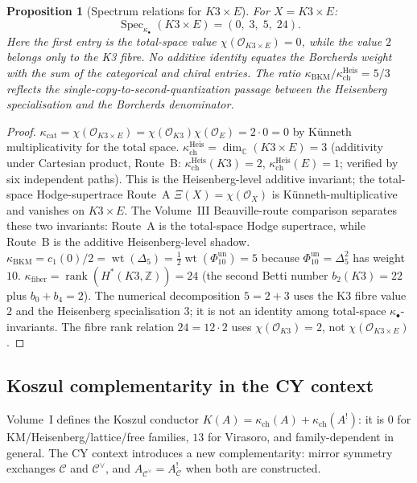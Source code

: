 \documentclass[11pt]{article}
\theoremstyle{plain}
\newtheorem{proposition}[theorem]{Proposition}
\theoremstyle{definition}
\theoremstyle{remark}
\newcommand{\cC}{\mathcal{C}}
\newcommand{\cO}{\mathcal{O}}
\newcommand{\bC}{\mathbb{C}}
\newcommand{\bZ}{\mathbb{Z}}
\DeclareMathOperator{\Spec}{Spec}
\begin{document}
\begin{proposition}[Spectrum relations for $K3 \times E$]
\label{prop:v3-st-k3e-spectrum}
For $X = K3 \times E$:
\[
 \Spec_{\kappa_\bullet}(K3 \times E)
 = (0,\; 3,\; 5,\; 24).
\]
Here the first entry is the total-space value
$\chi(\cO_{K3\times E})=0$, while the value $2$ belongs only to the
K3 fibre.  No additive identity equates the Borcherds weight with
the sum of the categorical and chiral entries.
The ratio
$\kappa_{\mathrm{BKM}}/\kappa_{\mathrm{ch}}^{\mathrm{Heis}} = 5/3$ reflects the
single-copy-to-second-quantization passage between the Heisenberg
specialisation and the Borcherds denominator.
\end{proposition}

\begin{proof}
$\kappa_{\mathrm{cat}} = \chi(\cO_{K3\times E})
= \chi(\cO_{K3})\chi(\cO_E)=2\cdot 0=0$ by K\"unneth multiplicativity
for the total space.
$\kappa_{\mathrm{ch}}^{\mathrm{Heis}} = \dim_\bC(K3 \times E) = 3$ (additivity
under Cartesian product, Route~B:
$\kappa_{\mathrm{ch}}^{\mathrm{Heis}}(K3) = 2$,
$\kappa_{\mathrm{ch}}^{\mathrm{Heis}}(E) = 1$;
verified by six independent paths).  This is the Heisenberg-level
additive invariant; the total-space Hodge-supertrace Route~A
$\Xi(X)=\chi(\cO_X)$ is K\"unneth-multiplicative and vanishes on
$K3 \times E$.
The Volume~III Beauville-route comparison separates these two
invariants: Route~A is the total-space Hodge supertrace, while
Route~B is the additive Heisenberg-level shadow.
$\kappa_{\mathrm{BKM}} = c_1(0)/2=\operatorname{wt}(\Delta_5)
=\frac{1}{2}\operatorname{wt}(\Phi_{10}^{\mathrm{un}})=5$ because
$\Phi_{10}^{\mathrm{un}} = \Delta_5^2$ has weight~$10$.
$\kappa_{\mathrm{fiber}} = \operatorname{rank}(H^*(K3, \bZ))
= 24$ (the second Betti number $b_2(K3) = 22$ plus
$b_0 + b_4 = 2$).  The numerical decomposition $5=2+3$ uses the K3
fibre value $2$ and the Heisenberg specialisation $3$; it is not an
identity among total-space $\kappa_\bullet$-invariants.  The fibre
rank relation $24 = 12 \cdot 2$ uses $\chi(\cO_{K3})=2$, not
$\chi(\cO_{K3\times E})$.
\end{proof}

\subsection{Koszul complementarity in the CY context}

Volume~I defines the Koszul conductor $K(A) =
\kappa_{\mathrm{ch}}(A) + \kappa_{\mathrm{ch}}(A^!)$: it is $0$
for KM/Heisenberg/lattice/free families, $13$ for Virasoro, and
family-dependent in general.  The CY context introduces a new
complementarity: mirror symmetry exchanges $\cC$ and $\cC^\vee$,
and $A_{\cC^\vee} = A_\cC^!$ when both are constructed.
\end{document}
